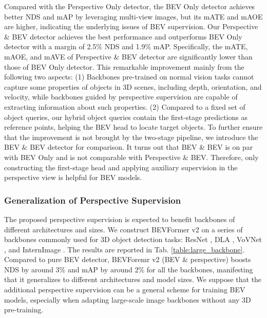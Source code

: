 \documentclass[10pt,twocolumn,letterpaper]{article}
\begin{document}
Compared with the Perspective Only detector, the BEV Only detector achieves better NDS and mAP by leveraging multi-view images, but its mATE and mAOE are higher, indicating the underlying issues of BEV supervision. 
Our Perspective \& BEV detector achieves the best performance and outperforms BEV Only detector with a margin of 2.5\% NDS and 1.9\% mAP. 
Specifically, the mATE, mAOE, and mAVE of Perspective \& BEV detector are significantly lower than those of BEV Only detector. 
This remarkable improvement mainly from the following two aspects: 
(1) Backbones pre-trained on normal vision tasks cannot capture some properties of objects in 3D scenes, including depth, orientation, and velocity, while backbones guided by perspective supervision are capable of extracting information about such properties.
(2) Compared to a fixed set of object queries, our hybrid object queries contain the first-stage predictions as reference points, helping the BEV head to locate target objects.
To further ensure that the improvement is not brought by the two-stage pipeline, we introduce the BEV \& BEV detector for comparison. 
It turns out that BEV \& BEV is on par with BEV Only and is not comparable with Perspective \& BEV. 
Therefore, only constructing the first-stage head and applying auxiliary supervision in the perspective view is helpful for BEV models.

\subsubsection{Generalization of Perspective Supervision}
The proposed perspective supervision is expected to benefit backbones of different architectures and sizes. 
We construct BEVFormer v2 on a series of backbones commonly used for 3D object detection tasks: ResNet \cite{ResNet}, DLA \cite{DLA}, VoVNet \cite{Vovnet}, and InternImage \cite{InternImage}. The results are reported in Tab. \ref{table:large_backbone}. 
Compared to pure BEV detector, BEVForemr v2 (BEV \& perspective) boosts NDS by around 3\% and mAP by around 2\% for all the backbones, manifesting that it generalizes to different architectures and model sizes. 
We suppose that the additional perspective supervision can be a general scheme for training BEV models, especially when adapting large-scale image backbones without any 3D pre-training.
\end{document}
